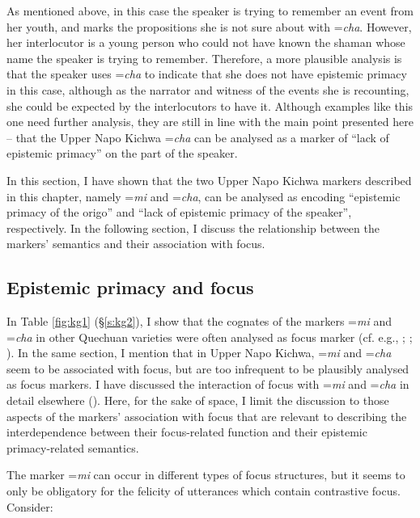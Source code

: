 \documentclass[output=paper]{langscibook}
\begin{document}
As mentioned above, in this case the speaker is trying to remember an event from her youth, and marks the propositions she is not sure about with =\textit{cha}. However, her interlocutor is a young person who could not have known the shaman whose name the speaker is trying to remember. Therefore, a more plausible analysis is that the speaker uses =\textit{cha} to indicate that she does not have epistemic primacy in this case, although as the narrator and witness of the events she is recounting, she could be expected by the interlocutors to have it. Although examples like this one need further analysis, they are still in line with the main point presented here – that the Upper Napo Kichwa =\textit{cha} can be analysed as a marker of “lack of epistemic primacy” on the part of the speaker.

In this section, I have shown that the two Upper Napo Kichwa markers described in this chapter, namely =\textit{mi} and =\textit{cha}, can be analysed as encoding “epistemic primacy of the origo” and “lack of epistemic primacy of the speaker”, respectively. In the following section, I discuss the relationship between the markers’ semantics and their association with focus. 


\subsection{Epistemic primacy and focus}\label{s:kg4-2}

In Table \ref{fig:kg1} (§\ref{s:kg2}), I show that the cognates of the markers =\textit{mi} and =\textit{cha} in other Quechuan  varieties were often analysed as focus marker (cf. e.g., \citealt{Muysken1995}; \citealt{Sanchez2010}; \citeyear{Sanchez2015}). In the same section, I mention that in Upper Napo Kichwa, =\textit{mi} and =\textit{cha} seem to be associated with focus, but are too infrequent to be plausibly analysed as focus markers. I have discussed the interaction of focus with =\textit{mi} and =\textit{cha} in detail elsewhere (\citealt[ch.4]{Grzech2016a}). Here, for the sake of space, I limit the discussion to those aspects of the markers’ association with focus that are relevant to describing the interdependence between their focus-related function and their epistemic primacy-related semantics.
 
The marker =\textit{mi} can occur in different types of focus structures, but it seems to only be obligatory for the felicity of utterances which contain contrastive focus. Consider:  
\end{document}
